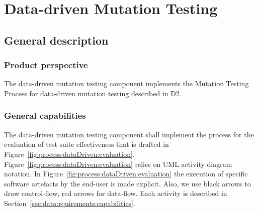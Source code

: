 


\chapter{Data-driven Mutation Testing}
\label{chapter:dataDriven}

\section{General description}




\subsection{Product perspective}
\RQ{} The data-driven mutation testing component implements the Mutation Testing Process for data-driven mutation testing described in D2.
\clearpage
\subsection{General capabilities}

\RQ{} The data-driven mutation testing component shall implement the process for the evaluation of test suite effectiveness that is drafted in Figure~\ref{fig:process:dataDriven:evaluation}. Figure~\ref{fig:process:dataDriven:evaluation} relies on UML activity diagram notation. In Figure~\ref{fig:process:dataDriven:evaluation} the execution of specific software artefacts by the end-user is made explicit. Also, we use black arrows to draw control-flow, red arrows for data-flow. Each activity is described in Section~\ref{sec:data:rquirements:capabilities}.

